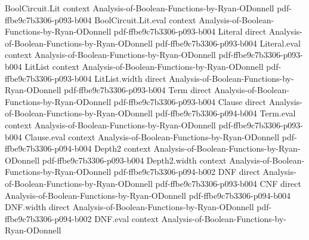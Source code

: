 \begin{theorem}
\leanok
{}
\proofstep
  {BoolCircuit.Lit}
  {context}
  {Analysis-of-Boolean-Functions-by-Ryan-ODonnell}
  {pdf-ffbe9c7b3306-p093-b004}
\proofstep
  {BoolCircuit.Lit.eval}
  {context}
  {Analysis-of-Boolean-Functions-by-Ryan-ODonnell}
  {pdf-ffbe9c7b3306-p093-b004}
\proofstep
  {Literal}
  {direct}
  {Analysis-of-Boolean-Functions-by-Ryan-ODonnell}
  {pdf-ffbe9c7b3306-p093-b004}
\proofstep
  {Literal.eval}
  {context}
  {Analysis-of-Boolean-Functions-by-Ryan-ODonnell}
  {pdf-ffbe9c7b3306-p093-b004}
\proofstep
  {LitList}
  {context}
  {Analysis-of-Boolean-Functions-by-Ryan-ODonnell}
  {pdf-ffbe9c7b3306-p093-b004}
\proofstep
  {LitList.width}
  {direct}
  {Analysis-of-Boolean-Functions-by-Ryan-ODonnell}
  {pdf-ffbe9c7b3306-p093-b004}
\proofstep
  {Term}
  {direct}
  {Analysis-of-Boolean-Functions-by-Ryan-ODonnell}
  {pdf-ffbe9c7b3306-p093-b004}
\proofstep
  {Clause}
  {direct}
  {Analysis-of-Boolean-Functions-by-Ryan-ODonnell}
  {pdf-ffbe9c7b3306-p094-b004}
\proofstep
  {Term.eval}
  {context}
  {Analysis-of-Boolean-Functions-by-Ryan-ODonnell}
  {pdf-ffbe9c7b3306-p093-b004}
\proofstep
  {Clause.eval}
  {context}
  {Analysis-of-Boolean-Functions-by-Ryan-ODonnell}
  {pdf-ffbe9c7b3306-p094-b004}
\proofstep
  {Depth2}
  {context}
  {Analysis-of-Boolean-Functions-by-Ryan-ODonnell}
  {pdf-ffbe9c7b3306-p093-b004}
\proofstep
  {Depth2.width}
  {context}
  {Analysis-of-Boolean-Functions-by-Ryan-ODonnell}
  {pdf-ffbe9c7b3306-p094-b002}
\proofstep
  {DNF}
  {direct}
  {Analysis-of-Boolean-Functions-by-Ryan-ODonnell}
  {pdf-ffbe9c7b3306-p093-b004}
\proofstep
  {CNF}
  {direct}
  {Analysis-of-Boolean-Functions-by-Ryan-ODonnell}
  {pdf-ffbe9c7b3306-p094-b004}
\proofstep
  {DNF.width}
  {direct}
  {Analysis-of-Boolean-Functions-by-Ryan-ODonnell}
  {pdf-ffbe9c7b3306-p094-b002}
\proofstep
  {DNF.eval}
  {context}
  {Analysis-of-Boolean-Functions-by-Ryan-ODonnell}

\end{theorem}
